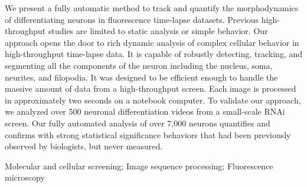 
We present a fully automatic method  to track and quantify the morphodynamics of differentiating neurons  in fluorescence  time-lapse datasets.  Previous high-throughput studies are limited to static analysis or simple behavior. Our approach opens the door to rich dynamic analysis of complex cellular behavior in high-throughput time-lapse data. It is capable of  robustly detecting, tracking,  and segmenting all the  components of the neuron including the nucleus, soma, neurites, and filopodia. It was designed to be efficient enough to handle the massive amount of data from a high-throughput screen. Each image is processed in approximately two seconds on a notebook computer. To validate  our approach,  we analyzed over 500 neuronal differentiation videos from a small-scale RNAi screen. Our fully automated analysis of over 7,000 neurons quantifies  and  confirms with strong statistical significance behaviors that  had  been previously observed by biologists, but never measured. 




\begin{keywords}
Molecular and cellular screening; Image sequence processing; Fluorescence microscopy
\end{keywords}

